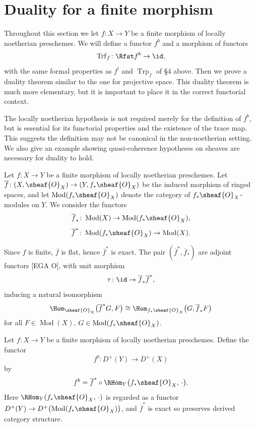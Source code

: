 
\setcounter{page}{164}
\section{Duality for a finite morphism}

Throughout this section we let \(f: X \to Y\) be a finite morphism of locally noetherian preschemes. We will define a functor \(f^b\) and a morphism of functors
\[
\operatorname{Trf}_f\colon \Rfst f^b \to \id,
\]
with the same formal properties as \(f^!\) and \(\operatorname{Trp}_f\) of \S4 above. Then we prove a duality theorem similar to the one for projective space. This duality theorem is much more elementary, but it is important to place it in the correct functorial context.

The locally noetherian hypothesis is not required merely for the definition of \(f^b\), but is essential for its functorial properties and the existence of the trace map. This suggests the definition may not be canonical in the non-noetherian setting. We also give an example showing quasi-coherence hypotheses on sheaves are necessary for duality to hold.

Let \(f: X \to Y\) be a finite morphism of locally noetherian preschemes. Let \(\overline{f}\colon (X,\sheaf{O}_X)\to (Y,f_*\sheaf{O}_X)\) be the induced morphism of ringed spaces, and let \(\operatorname{Mod}(f_*\sheaf{O}_X)\) denote the category of \(f_*\sheaf{O}_X\)-modules on \(Y\). We consider the functors
\setcounter{page}{165}
\[
\overline{f}_{*}\colon \operatorname{Mod}(X) \to \operatorname{Mod}(f_{*}\sheaf{O}_X),
\]
\[
\overline{f}^{*}\colon \operatorname{Mod}(f_{*}\sheaf{O}_X) \to \operatorname{Mod}(X).
\]

Since \(f\) is finite, \(\overline{f}\) is flat, hence \(\overline{f}^*\) is exact. The pair \((\overline{f}^*,\overline{f}_*)\) are adjoint functors [EGA O], with unit morphism
\[
\tau\colon \id \to \overline{f}_{*}\overline{f}^{*},
\]
inducing a natural isomorphism
\[
\Hom_{\sheaf{O}_X}\bigl(\overline{f}^*G, F\bigr)
\cong
\Hom_{f_*\sheaf{O}_X}\bigl(G, \overline{f}_*F\bigr)
\]
for all \(F\in\operatorname{Mod}(X)\), \(G\in\operatorname{Mod}(f_*\sheaf{O}_X)\).

\begin{definition}
Let \(f: X \to Y\) be a finite morphism of locally noetherian preschemes. Define the functor
\[
f^{b}\colon D^{+}(Y) \to D^{+}(X)
\]
by
\[
f^{b}
= \overline{f}^{*} \circ \RHom_{Y}\bigl(f_{*}\sheaf{O}_X,\,\cdot\bigr).
\]
Here \(\RHom_Y(f_*\sheaf{O}_X,\,\cdot)\) is regarded as a functor \(D^+(Y)\to D^+\bigl(\operatorname{Mod}(f_*\sheaf{O}_X)\bigr)\), and \(\overline{f}^*\) is exact so preserves derived category structure.
\end{definition}

